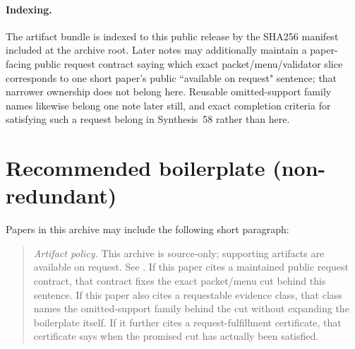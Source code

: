 \documentclass[11pt]{article}
\begin{document}
\paragraph{Indexing.}
The artifact bundle is indexed to this public release by the SHA256 manifest included at the archive root. Later notes may additionally maintain a paper-facing public request contract saying which exact packet/menu/validator slice corresponds to one short paper's public ``available on request" sentence; that narrower ownership does not belong here. Reusable omitted-support family names likewise belong one note later still, and exact completion criteria for satisfying such a request belong in Synthesis~58 rather than here.\cite{series:publicrequestcontracts,series:requestableevidenceclasses,series:requestfulfillmentcertificates}

\section{Recommended boilerplate (non-redundant)}
Papers in this archive may include the following short paragraph:
\begin{quote}
\emph{Artifact policy.} This archive is source-only; supporting artifacts are available on request. See \cite{series:artifactpolicy}. If this paper cites a maintained public request contract, that contract fixes the exact packet/menu cut behind this sentence. If this paper also cites a requestable evidence class, that class names the omitted-support family behind the cut without expanding the boilerplate itself. If it further cites a request-fulfillment certificate, that certificate says when the promised cut has actually been satisfied.\cite{series:publicrequestcontracts,series:requestableevidenceclasses,series:requestfulfillmentcertificates}
\end{quote}
\end{document}
